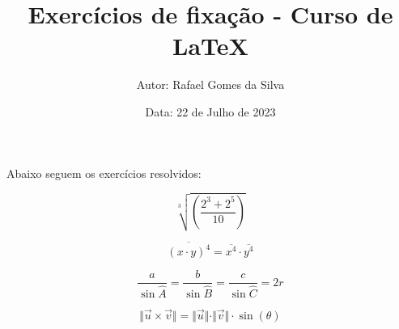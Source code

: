 \documentclass[12pt]{article}
\title{\textbf{Exercícios de fixação - Curso de LaTeX}}
\author{Autor: Rafael Gomes da Silva}
\date{Data: 22 de Julho de 2023}
\begin{document}
\maketitle

Abaixo seguem os exercícios resolvidos:

\begin{equation}
	\sqrt[3]{\left(\frac{2^{3}+2^{5}}{10}\right)}
\end{equation}

\begin{equation}
	\overline{(x \cdot y)^{4}} = \overline{x^{4}} \cdot \overline{y^{4}}
\end{equation}

\begin{equation}
	\frac{a}{\sin \widehat{A}} = \frac{b}{\sin \widehat{B}} = \frac{c}{\sin \widehat{C}} = 2r
\end{equation}

\begin{equation}
	\Vert \vec{u} \times \vec{v} \Vert= \Vert \vec{u} \Vert \cdot \Vert \vec{v} \Vert \cdot \sin(\theta)
\end{equation}
   
\end{document}
